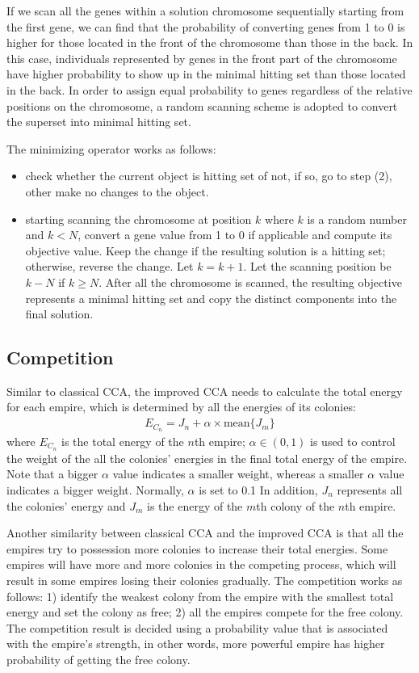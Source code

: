 If we scan all the genes within a solution chromosome sequentially starting from the first gene, we can find that the probability of converting genes from 1 to 0 is higher for those located in the front of the chromosome than those in the back.
In this case, individuals represented by genes in the front part of the chromosome have higher probability to show up in the minimal hitting set than those located in the back.
In order to assign equal probability to genes regardless of the relative positions on the chromosome, a random scanning scheme is adopted to convert the superset into minimal hitting set.

The minimizing operator works as follows:
\begin{itemize}
	\item check whether the current object is hitting set of not, if so, go to step (2), other make no changes to the object.
	\item starting scanning the chromosome at position $k$ where $k$ is a random number and $k < N$, convert a gene value from 1 to 0 if applicable and compute its objective value. Keep the change if the resulting solution is a hitting set; otherwise, reverse the change. Let $k = k + 1$. Let the scanning position be $k - N$ if $k \geq N$. After all the chromosome is scanned, the resulting objective represents a minimal hitting set and copy the distinct components into the final solution.
\end{itemize}


\subsection{Competition}
Similar to classical CCA, the improved CCA needs to calculate the total energy for each empire, which is determined by all the energies of its colonies:
\begin{align}
	E_{C_n} = J_n + \alpha \times \text{mean}\{J_m\}
\end{align}
where $E_{C_n}$ is the total energy of the $n$th empire; $\alpha \in (0, 1)$ is used to control the weight of the all the colonies' energies in the final total energy of the empire.
Note that a bigger $\alpha$ value indicates a smaller weight, whereas a smaller $\alpha$ value indicates a bigger weight.
Normally, $\alpha$ is set to 0.1
In addition, $J_n$ represents all the colonies' energy and $J_m$ is the energy of the $m$th colony of the $n$th empire.

Another similarity between classical CCA and the improved CCA is that all the empires try to possession more colonies to increase their total energies.
Some empires will have more and more colonies in the competing process, which will result in some empires losing their colonies gradually.
The competition works as follows: 1) identify the weakest colony from the empire with the smallest total energy and set the colony as free; 2) all the empires compete for the free colony.
The competition result is decided using a probability value that is associated with the empire's strength, in other words, more powerful empire has higher probability of getting the free colony.

